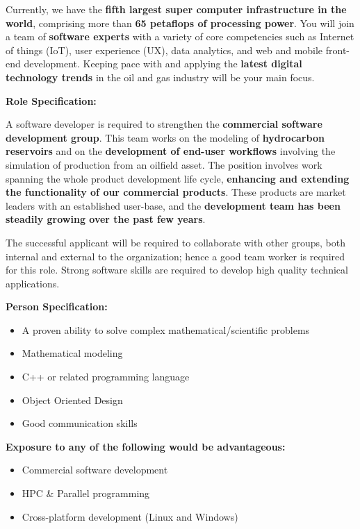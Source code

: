 \documentclass[12pt,a4paper]{article}
\begin{document}
Currently, we have the \textbf{fifth largest super computer infrastructure
  in the world}, comprising more than \textbf{65 petaflops of processing
  power}. You will join a team of \textbf{software experts} with a variety
of core competencies such as Internet of things (IoT), user experience (UX),
data analytics, and web and mobile front-end development. Keeping pace with
and applying the \textbf{latest digital technology trends} in the oil and
gas industry will be your main focus.

\textbf{Role Specification:}

A software developer is required to strengthen the \textbf{commercial
  software development group}. This team works on the modeling of
\textbf{hydrocarbon reservoirs} and on the \textbf{development of end-user
  workflows} involving the simulation of production from an oilfield asset.
The position involves work spanning the whole product development life
cycle, \textbf{enhancing and extending the functionality of our commercial
  products}. These products are market leaders with an established
user-base, and the \textbf{development team has been steadily growing over
  the past few years}.

The successful applicant will be required to collaborate with other groups,
both internal and external to the organization; hence a good team worker is
required for this role. Strong software skills are required to develop high
quality technical applications.

\textbf{Person Specification:}
\begin{itemize}%
\item A proven ability to solve complex mathematical/scientific problems
\item Mathematical modeling
\item C++ or related programming language 
\item Object Oriented Design
\item Good communication skills
\end{itemize}

\textbf{Exposure to any of the following would be advantageous:}
\begin{itemize}%
\item Commercial software development 
\item HPC \& Parallel programming
\item Cross-platform development (Linux and Windows)
\end{itemize}
\end{document}
